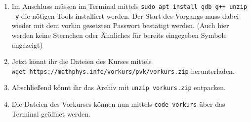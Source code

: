 \begin{enumerate}
	\item Im Anschluss müssen im Terminal mittels \texttt{sudo apt install gdb g++ unzip -y} die nötigen Tools installiert werden.
	      Der Start des Vorgangs muss dabei wieder mit dem vorhin gesetzten Passwort bestätigt werden.
	      (Auch hier werden keine Sternchen oder Ähnliches für bereits eingegeben Symbole angezeigt)
	\item Jetzt könnt ihr die Dateien des Kurses mittels \\
	      \texttt{wget https://mathphys.info/vorkurs/pvk/vorkurs.zip} herunterladen.
	\item Abschließend könnt ihr das Archiv mit \texttt{unzip vorkurs.zip} entpacken.
	\item Die Dateien des Vorkurses können nun mittels \texttt{code vorkurs} über das Terminal geöffnet werden.
\end{enumerate}
